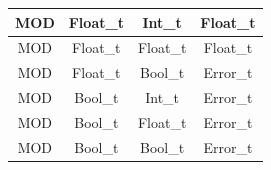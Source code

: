 \begin{figure}[H]
\begin{tabular}{cccc}
        \midrule MOD & Float\_t & Int\_t    & Float\_t \\
        \midrule MOD & Float\_t & Float\_t  & Float\_t \\
        \midrule MOD & Float\_t & Bool\_t   & Error\_t \\

        \midrule MOD & Bool\_t & Int\_t     & Error\_t \\
        \midrule MOD & Bool\_t & Float\_t   & Error\_t \\
        \midrule MOD & Bool\_t & Bool\_t    & Error\_t \\

        \bottomrule
    \end{tabular}\\
\end{figure}

\newpage

